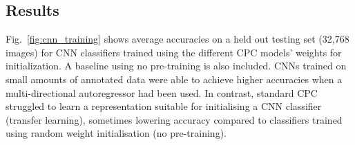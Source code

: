 \subsection{Results}
Fig.~\ref{fig:cnn_training} shows average accuracies on a held out testing set (32,768 images) for CNN classifiers trained using the different CPC models' weights for initialization. A baseline using no pre-training is also included. CNNs trained on small amounts of annotated data were able to achieve higher accuracies when a multi-directional autoregressor had been used.  In contrast, standard CPC struggled to learn a representation suitable for initialising a CNN classifier (transfer learning), sometimes lowering accuracy compared to classifiers trained using random weight initialisation (no pre-training).

\begin{table}[]
	\centering
	\caption{Mean test accuracies of the CNN classifiers (standard deviations in parentheses).}
	\label{tab:cnn_results}
\end{table}
